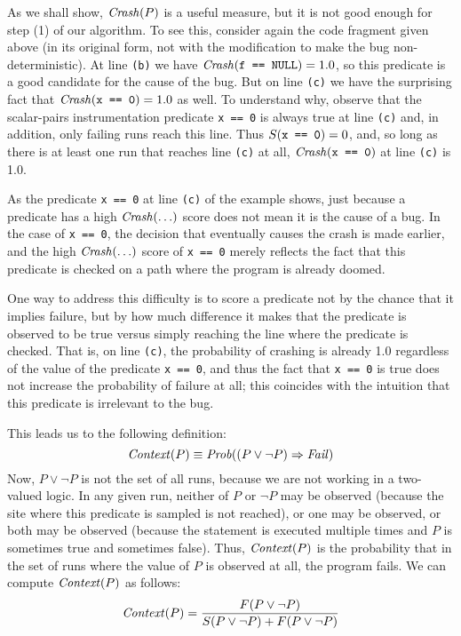 As we shall show, $\mbox{\textit{Crash}}(P)$ is a useful measure, but it is not good
enough for step (1) of our algorithm. To see this, consider again the
code fragment given above (in its original form, not with the
modification to make the bug non-deterministic).  At line {\tt (b)} we
have $\mbox{\textit{Crash}}(\mbox{\tt f == NULL}) = 1.0$, so this predicate is a good
candidate for the cause of the bug.
But on line {\tt (c)} we have the surprising fact that $\mbox{\textit{Crash}}(\mbox{\tt x == 0}) = 1.0$ as well.
To understand why, observe that the scalar-pairs instrumentation
predicate \texttt{x == 0} is always true at line {\tt (c)} and, in
addition,
only failing runs reach this line.
Thus $S(\mbox{\tt x == 0}) = 0$, and, so long as there is at least one run that
reaches line {\tt (c)} at all, $\mbox{\textit{Crash}}(\mbox{\tt x == 0})$ at line {\tt (c)} is 1.0.

As the predicate {\tt x == 0} at line {\tt (c)} of the example
shows, just because a predicate has a high $\mbox{\textit{Crash}}(\ldots)$ score does not
mean it is the cause of a bug.  In the case of {\tt x == 0}, the
decision that eventually causes the crash is made earlier, and the
high $\mbox{\textit{Crash}}(\ldots)$ score of {\tt x == 0} merely reflects the fact that this
predicate is checked on a path where the program is already doomed.

One way to address this difficulty is to score a predicate not by the chance
that it implies failure, but by how much difference it makes that the predicate
is observed to be true versus simply reaching the line where the predicate is checked.
That is, on line {\tt (c)}, the probability of crashing is already 1.0 regardless
of the value of the predicate {\tt x == 0}, and thus the fact that {\tt x == 0} is
true does not increase the probability of failure at all; this coincides with
the intuition that this predicate is irrelevant to the bug.

This leads us to the following definition:
\[ \mbox{\textit{Context}}(P) \equiv \mbox{\textit{Prob}}((P \lor \lnot P) \Rightarrow \mbox{\textit{Fail}}) \]
Now, $P \lor \lnot P$ is not the set of all runs, because we are not working in a two-valued logic.
In any given run, neither of $P$ or $\lnot P$ may be observed (because the site where this predicate is
sampled is not reached), or one may be observed, or both may be observed (because the statement is executed
multiple times and $P$ is sometimes true and sometimes false).  Thus, $\mbox{\textit{Context}}(P)$ is the probability that
in the set of runs where the value of $P$ is observed at all, the program fails. We can compute $\mbox{\textit{Context}}(P)$ as follows:
\[ \mbox{\textit{Context}}(P) = \frac{F(P \lor \lnot P)}{S(P \lor \lnot P) + F(P \lor \lnot P)} \]

